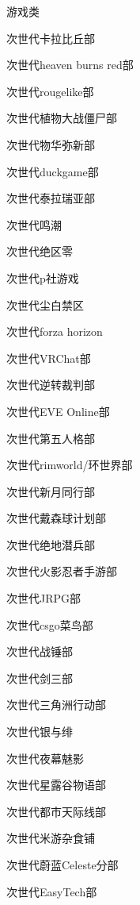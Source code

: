 \begin{multicols}{3}
\begin{categorysection}{游戏类}
        \item 次世代卡拉比丘部
        \item 次世代heaven burns red部
        \item 次世代rougelike部
        \item 次世代植物大战僵尸部
        \item 次世代物华弥新部
        \item 次世代duckgame部
        \item 次世代泰拉瑞亚部
        \item 次世代鸣潮
        \item 次世代绝区零
        \item 次世代p社游戏
        \item 次世代尘白禁区
        \item 次世代forza horizon
        \item 次世代VRChat部
        \item 次世代逆转裁判部
        \item 次世代EVE Online部
        \item 次世代第五人格部
        \item 次世代rimworld/环世界部
        \item 次世代新月同行部
        \item 次世代戴森球计划部
        \item 次世代绝地潜兵部
        \item 次世代火影忍者手游部
        \item 次世代JRPG部
        \item 次世代csgo菜鸟部
        \item 次世代战锤部
        \item 次世代剑三部
        \item 次世代三角洲行动部
        \item 次世代银与绯
        \item 次世代夜幕魅影
        \item 次世代星露谷物语部
        \item 次世代都市天际线部
        \item 次世代米游杂食铺
        \item 次世代蔚蓝Celeste分部
        \item 次世代EasyTech部
    \end{categorysection}


\end{multicols}
